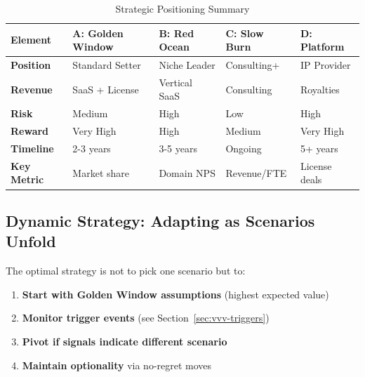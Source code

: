 \begin{table}[htbp]
\centering
\caption{Strategic Positioning Summary}
\label{tab:vvv-positioning-summary}
\renewcommand{\arraystretch}{1.4}
\begin{tabular}{@{}lp{2.5cm}p{2.5cm}p{2.5cm}p{2.5cm}@{}}
\toprule
\textbf{Element} & \textbf{A: Golden Window} & \textbf{B: Red Ocean} & \textbf{C: Slow Burn} & \textbf{D: Platform} \\
\midrule
\textbf{Position} & Standard Setter & Niche Leader & Consulting+ & IP Provider \\
\textbf{Revenue} & SaaS + License & Vertical SaaS & Consulting & Royalties \\
\textbf{Risk} & Medium & High & Low & High \\
\textbf{Reward} & Very High & High & Medium & Very High \\
\textbf{Timeline} & 2-3 years & 3-5 years & Ongoing & 5+ years \\
\textbf{Key Metric} & Market share & Domain NPS & Revenue/FTE & License deals \\
\bottomrule
\end{tabular}
\end{table}


\subsection{Dynamic Strategy: Adapting as Scenarios Unfold}

The optimal strategy is not to pick one scenario but to:

\begin{enumerate}
\item \textbf{Start with Golden Window assumptions} (highest expected value)
\item \textbf{Monitor trigger events} (see Section~\ref{sec:vvv-triggers})
\item \textbf{Pivot if signals indicate different scenario}
\item \textbf{Maintain optionality} via no-regret moves
\end{enumerate}

